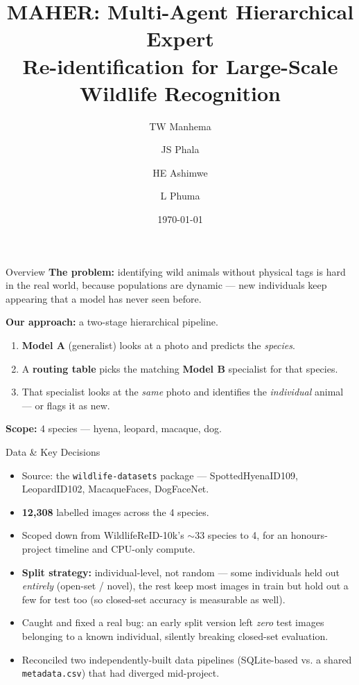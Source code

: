 \documentclass{beamer}
\title[MAHER]{MAHER: Multi-Agent Hierarchical Expert\\Re-identification for Large-Scale Wildlife Recognition}
\author[Manhema et al.]{TW Manhema \and JS Phala \and HE Ashimwe \and L Phuma}
\institute[UJ]{Academy of Computer Science and Software Engineering, University of Johannesburg}
\date{\today}
\begin{document}
\frame{\titlepage}

\begin{frame}{Overview}
  \textbf{The problem:} identifying wild animals without physical tags is hard
  in the real world, because populations are dynamic --- new individuals keep
  appearing that a model has never seen before.

  \vspace{0.5em}
  \textbf{Our approach:} a two-stage hierarchical pipeline.
  \begin{enumerate}
    \item \textbf{Model A} (generalist) looks at a photo and predicts the
      \emph{species}.
    \item A \textbf{routing table} picks the matching \textbf{Model B}
      specialist for that species.
    \item That specialist looks at the \emph{same} photo and identifies the
      \emph{individual} animal --- or flags it as new.
  \end{enumerate}

  \vspace{0.5em}
  \textbf{Scope:} 4 species --- hyena, leopard, macaque, dog.
\end{frame}

\begin{frame}{Data \& Key Decisions}
  \begin{itemize}
    \item Source: the \texttt{wildlife-datasets} package ---
      SpottedHyenaID109, LeopardID102, MacaqueFaces, DogFaceNet.
    \item \textbf{12{,}308} labelled images across the 4 species.
    \item Scoped down from WildlifeReID-10k's $\sim$33 species to 4, for an
      honours-project timeline and CPU-only compute.
    \item \textbf{Split strategy:} individual-level, not random --- some
      individuals held out \emph{entirely} (open-set / novel), the rest keep
      most images in train but hold out a few for test too (so closed-set
      accuracy is measurable as well).
    \item Caught and fixed a real bug: an early split version left
      \emph{zero} test images belonging to a known individual, silently
      breaking closed-set evaluation.
    \item Reconciled two independently-built data pipelines (SQLite-based vs.
      a shared \texttt{metadata.csv}) that had diverged mid-project.
  \end{itemize}
\end{frame}
\end{document}
